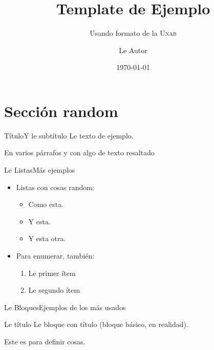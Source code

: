 \documentclass[aspectratio=169]{beamer}
\title{Template de Ejemplo}
\subtitle{Usando formato de la \textsc{Unab}}
\date{\today}
\author[Autor]{Le Autor}
\institute{Universidad Andrés Bello}
\begin{document}

\begin{frame}
  \titlepage
\end{frame}

\section{Sección random}
\begin{frame}{Título}{Y le subtítulo}
	Le texto de ejemplo.
	
	En varios párrafos y con algo de texto \alert{resaltado}
\end{frame}

\begin{frame}{Le Listas}{Más ejemplos}
	\begin{itemize}
	\item Listas con cosas random:
		\begin{itemize}
		\item Como esta.
		\item Y esta.
		\item Y esta otra.
		\end{itemize}

	\item Para enumerar, también:
		\begin{enumerate}
		\item Le primer ítem
		\item Le segundo ítem
		\end{enumerate}
	\end{itemize}
\end{frame}

\begin{frame}{Le Bloques}{Ejemplos de los más usados}
	\begin{block}{Le título}
		Le bloque con \alert{título} (bloque básico, en realidad).
	\end{block}
	
	\begin{definition}
		Este es para \alert{definir} cosas.
	\end{definition}
	
\end{frame}
\end{document}
